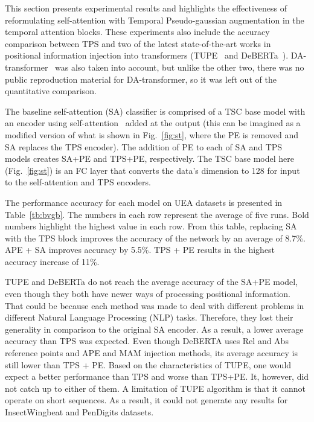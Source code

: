 \documentclass[journal]{IEEEtran}
\begin{document}
\begin{table}[!t]
  \label{tb:bvgb}\end{table}This section presents experimental results and highlights the effectiveness of reformulating self-attention with Temporal Pseudo-gaussian augmentation in the temporal attention blocks. These experiments also include the accuracy comparison between TPS and two of the latest state-of-the-art works in positional information injection into transformers (TUPE~\cite{ke_rethinking_2021} and DeBERTa~\cite{he2021deberta}). DA-transformer~\cite{wu_da-transformer_2021} was also taken into account, but unlike the other two, there was no public reproduction material for DA-transformer, so it was left out of the quantitative comparison.

The baseline self-attention (SA) classifier is comprised of a TSC base model with an encoder using self-attention~\cite{vaswani2017attention} added at the output (this can be imagined as a modified version of what is shown in Fig.~\ref{fig:st}, where the PE is removed and SA replaces the TPS encoder). The addition of PE to each of SA and TPS models creates SA+PE and TPS+PE, respectively. The TSC base model here (Fig.~\ref{fig:st}) is an FC layer that converts the data's dimension to 128 for input to the self-attention and TPS encoders.

The performance accuracy for each model on UEA datasets is presented in Table~\ref{tb:bvgb}. The numbers in each row represent the average of five runs. Bold numbers highlight the highest value in each row. From this table, replacing SA with the TPS block improves the accuracy of the network by an average of 8.7\%. APE + SA improves accuracy by 5.5\%. TPS + PE results in the highest accuracy increase of 11\%.

TUPE and DeBERTa do not reach the average accuracy of the SA+PE model, even though they both have newer ways of processing positional information. That could be because each method was made to deal with different problems in different Natural Language Processing (NLP) tasks. Therefore, they lost their generality in comparison to the original SA encoder. As a result, a lower average accuracy than TPS was expected. Even though DeBERTA uses Rel and Abs reference points and APE and MAM injection methods, its average accuracy is still lower than TPS + PE. Based on the characteristics of TUPE, one would expect a better performance than TPS and worse than TPS+PE. It, however, did not catch up to either of them. A limitation of TUPE algorithm is that it cannot operate on short sequences. As a result, it could not generate any results for InsectWingbeat and PenDigits datasets.
\end{document}
